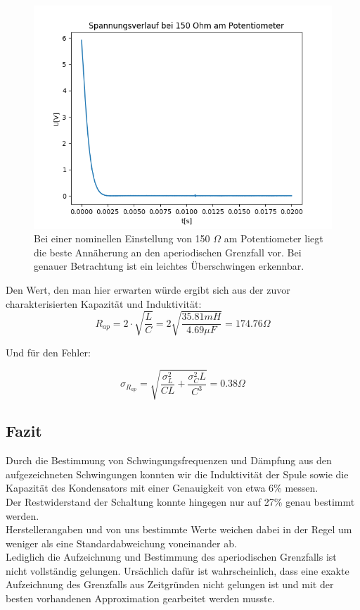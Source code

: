 \documentclass[12pt,a4paper]{article}
\begin{document}
\begin{figure}
\begin{center}
\includegraphics[scale=0.7]{Bilder/Spannungsverlauf150Ohm}
\caption{Bei einer nominellen Einstellung von 150 $\Omega$ am Potentiometer liegt die beste Annäherung an den aperiodischen Grenzfall vor. Bei genauer Betrachtung ist ein leichtes Überschwingen erkennbar.}
\label{fig:Aperiodisch}
\end{center}
\end{figure}


Den Wert, den man hier erwarten würde ergibt sich aus der zuvor charakterisierten Kapazität und Induktivität:
\begin{equation}
R_{ap}=2\cdot \sqrt{\frac{L}{C}}=2\sqrt{\frac{35.81mH}{4.69\mu F}}=174.76\Omega
\end{equation}

Und für den Fehler:

\begin{equation}
\sigma_{R_{ap}}=\sqrt{\frac{\sigma_L^2}{CL}+\frac{\sigma_C^2 L}{C^3}}=0.38 \Omega
\end{equation}



\subsection{Fazit}
Durch die Bestimmung von Schwingungsfrequenzen und Dämpfung aus den aufgezeichneten Schwingungen konnten wir die Induktivität der Spule sowie die Kapazität des Kondensators mit einer Genauigkeit von etwa 6\% messen.\\
Der Restwiderstand der Schaltung konnte hingegen nur auf 27\% genau bestimmt werden.\\
Herstellerangaben und von uns bestimmte Werte weichen dabei in der Regel um weniger als eine Standardabweichung voneinander ab.\\
Lediglich die Aufzeichnung und Bestimmung des aperiodischen Grenzfalls ist nicht vollständig gelungen. Ursächlich dafür ist wahrscheinlich, dass eine exakte Aufzeichnung des Grenzfalls aus Zeitgründen nicht gelungen ist und mit der besten vorhandenen Approximation gearbeitet werden musste.
\end{document}
